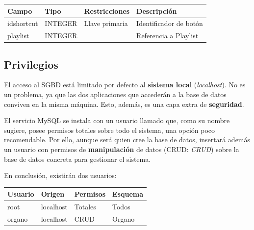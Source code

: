 \smallskip

\smallskip

\begin{center}
	\begin{tabular}{|l|l|l|l|}
		\hline \textbf{Campo} & \textbf{Tipo} & \textbf{Restricciones} & \textbf{Descripción} \\ 
		\hline idshortcut & INTEGER & Llave primaria & Identificador de botón \\ 
		\hline playlist & INTEGER & & Referencia a Playlist \\ 
		\hline 
	\end{tabular}
	\smallskip
\end{center}

\smallskip

\subsection{Privilegios}

El acceso al \acrshort{SGBD} está limitado por defecto al \textbf{sistema local} (\textit{localhost}). No es un problema, ya que las dos aplicaciones que accederán a la base de datos conviven en la misma máquina. Esto, además, es una capa extra de \textbf{seguridad}.

El servicio MySQL se instala con un usuario llamado \textbf{} que, como su nombre sugiere, posee permisos totales sobre todo el sistema, una opción poco recomendable. Por ello, aunque será  quien cree la base de datos, insertará además un usuario con permisos de \textbf{manipulación} de datos (\acrshort{CRUD}: \textit{\acrlong{CRUD}}) sobre la base de datos concreta para gestionar el sistema.

En conclusión, existirán dos usuarios:

\smallskip

\begin{center}
	\begin{tabular}{|l|l|l|l|}
		\hline \textbf{Usuario} & \textbf{Origen} & \textbf{Permisos} & \textbf{Esquema} \\ 
		\hline root & localhost & Totales & Todos \\
		\hline organo & localhost & \acrshort{CRUD} & Organo \\ 
		\hline 
	\end{tabular}
	\smallskip
\end{center}

